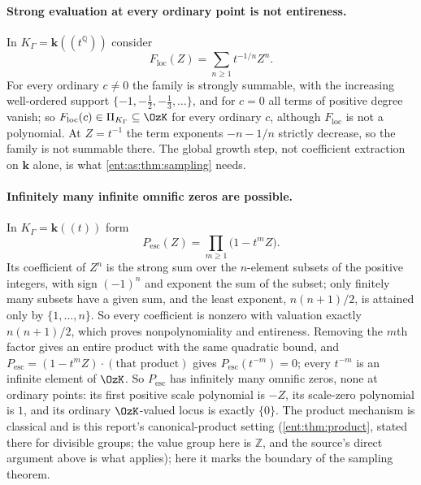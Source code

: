 \documentclass[11pt]{article}
\theoremstyle{plain}
\theoremstyle{plain}
\theoremstyle{plain}
\theoremstyle{definition}
\theoremstyle{definition}
\theoremstyle{definition}
\theoremstyle{definition}
\theoremstyle{remark}
\newcommand{\Q}{\mathbb Q}\newcommand{\Z}{\mathbb Z}\newcommand{\N}{\mathbb N}
\newcommand{\K}{K_\Gamma}\newcommand{\KD}{K_\Delta}
\newcommand{\kk}{\mathbf k}\newcommand{\PP}{\mathbb P}
\newcommand{\PiK}{\Pi_{\K}}\newcommand{\pg}{\mathsf p}
\begin{document}
\paragraph{Strong evaluation at every ordinary point is not entireness.} In
$\K=\kk((t^\Q))$ consider
\begin{equation}\label{ent:as:eq:local-counterexample}
 F_{\mathrm{loc}}(Z)=\sum_{n\ge1}t^{-1/n}Z^n .
\end{equation}
For every ordinary $c\ne0$ the family is strongly summable, with the
increasing well-ordered support $\{-1,-\tfrac12,-\tfrac13,\ldots\}$, and for
$c=0$ all terms of positive degree vanish; so $F_{\mathrm{loc}}(c)\in\PiK\subseteq
\OzK$ for every ordinary $c$, although $F_{\mathrm{loc}}$ is not a polynomial.
At $Z=t^{-1}$ the term exponents $-n-1/n$ strictly decrease, so the family is
not summable there. The global growth step, not coefficient extraction on
$\kk$ alone, is what \cref{ent:as:thm:sampling} needs.

\paragraph{Infinitely many infinite omnific zeros are possible.} In
$\K=\kk((t))$ form
\begin{equation}\label{ent:as:eq:qproduct}
 P_{\mathrm{esc}}(Z)=\prod_{m\ge1}\bigl(1-t^mZ\bigr).
\end{equation}
Its coefficient of $Z^n$ is the strong sum over the $n$-element subsets of the
positive integers, with sign $(-1)^n$ and exponent the sum of the subset; only
finitely many subsets have a given sum, and the least exponent,
$n(n+1)/2$, is attained only by $\{1,\ldots,n\}$. So every coefficient is
nonzero with valuation exactly $n(n+1)/2$, which proves nonpolynomiality and
entireness. Removing the $m$th factor gives an entire product with the same
quadratic bound, and $P_{\mathrm{esc}}=(1-t^mZ)\cdot(\text{that product})$ gives
$P_{\mathrm{esc}}(t^{-m})=0$; every $t^{-m}$ is an infinite element of $\OzK$.
So $P_{\mathrm{esc}}$ has infinitely many omnific zeros, none at ordinary
points: its first positive scale polynomial is $-Z$, its scale-zero polynomial
is $1$, and its ordinary $\OzK$-valued locus is exactly $\{0\}$. The product
mechanism is classical and is this report's canonical-product setting
(\cref{ent:thm:product}, stated there for divisible groups; the value group
here is $\Z$, and the source's direct argument above is what applies); here it
marks the boundary of the sampling theorem.
\end{document}
